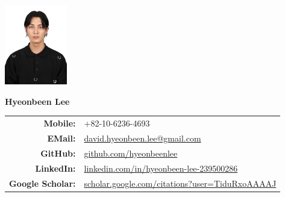 \documentclass[a4paper,10pt]{extarticle}
\begin{document}
\pagestyle{empty}



\begin{minipage}{0.1\textwidth}
    \begin{flushleft}
        \includegraphics[height=3.5cm]{photo_231008.jpeg}
    \end{flushleft}
\end{minipage}
\hfill
\begin{minipage}{0.7\textwidth}
    \begin{flushright}
        \textbf{\Large Hyeonbeen Lee} %
        \newline\newline
        \begin{tabular}{rl}
            \textbf{Mobile: }         & +82-10-6236-4693                                                                                              \\
            \textbf{EMail: }          & \href{mailto:david.hyeonbeen.lee@gmail.com}{david.hyeonbeen.lee@gmail.com}                                    \\
            \textbf{GitHub: }         & \href{https://github.com/hyeonbeenlee}{github.com/hyeonbeenlee}                                               \\
            \textbf{LinkedIn: }       & \href{https://www.linkedin.com/in/hyeonbeen-lee-239500286/}{linkedin.com/in/hyeonbeen-lee-239500286}          \\
            \textbf{Google Scholar: } & \href{https://scholar.google.com/citations?user=TiduRxoAAAAJ}{scholar.google.com/citations?user=TiduRxoAAAAJ} \\
        \end{tabular}
    \end{flushright}

\end{minipage}
\end{document}
